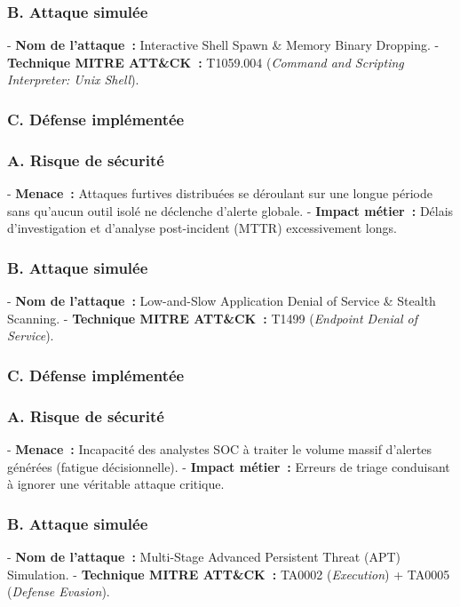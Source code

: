 \subsubsection{B. Attaque simulée}
- \textbf{Nom de l'attaque~:} Interactive Shell Spawn \& Memory Binary Dropping.
- \textbf{Technique MITRE ATT\&CK~:} T1059.004 (\textit{Command and Scripting Interpreter: Unix Shell}).

\subsubsection{C. Défense implémentée}

\vspace{0.3cm}
\subsubsection{A. Risque de sécurité}
- \textbf{Menace~:} Attaques furtives distribuées se déroulant sur une longue période sans qu'aucun outil isolé ne déclenche d'alerte globale.
- \textbf{Impact métier~:} Délais d'investigation et d'analyse post-incident (MTTR) excessivement longs.

\subsubsection{B. Attaque simulée}
- \textbf{Nom de l'attaque~:} Low-and-Slow Application Denial of Service \& Stealth Scanning.
- \textbf{Technique MITRE ATT\&CK~:} T1499 (\textit{Endpoint Denial of Service}).

\subsubsection{C. Défense implémentée}

\vspace{0.3cm}
\subsubsection{A. Risque de sécurité}
- \textbf{Menace~:} Incapacité des analystes SOC à traiter le volume massif d'alertes générées (fatigue décisionnelle).
- \textbf{Impact métier~:} Erreurs de triage conduisant à ignorer une véritable attaque critique.

\subsubsection{B. Attaque simulée}
- \textbf{Nom de l'attaque~:} Multi-Stage Advanced Persistent Threat (APT) Simulation.
- \textbf{Technique MITRE ATT\&CK~:} TA0002 (\textit{Execution}) + TA0005 (\textit{Defense Evasion}).

